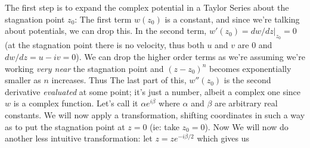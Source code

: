 \documentclass[12pt]{book}
\begin{document}
{The first step is to expand the complex potential in a Taylor Series about the stagnation point $z_0$:
The first term $w(z_0)$ is a constant, and since we're talking about potentials, we can drop this. In the second term, $w'(z_0)=dw/dz|_{z_0} =0$ (at the stagnation point there is no velocity, thus both $u$ and $v$ are $0$ and $dw/dz = u-iv = 0$).  We can drop the higher order terms as we're assuming we're working \textit{very near} the stagnation point and $(z-z_0)^n$ becomes exponentially smaller as $n$ increases.  Thus
The last part of this, $w''(z_0)$ is the second derivative \textit{evaluated} at some point;  it's just a number, albeit a complex one since $w$ is a complex function.  Let's call it $\alpha e^{i\beta}$ where $\alpha$ and $\beta$ are arbitrary real constants.  We will now apply a transformation, shifting coordinates in such a way as to put the stagnation point at $z=0$ (ie: take $z_0 = 0$). Now
We will now do another less intuitive transformation: let $z = z e^{-i\beta / 2}$ which gives us

}
\end{document}
